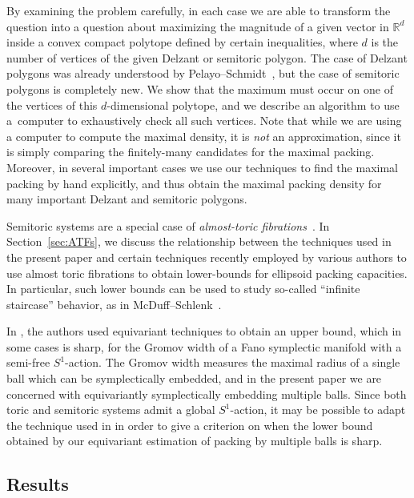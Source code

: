\documentclass[10pt,a4paper]{amsart}
\numberwithin{equation}{section}
\theoremstyle{definition}
\theoremstyle{plain}
\theoremstyle{plain}
\begin{document}
By examining the problem carefully, in each case we are able to transform the question into a question about maximizing the magnitude of a given vector in $\mathbb{R}^d$ inside a convex compact polytope defined by certain inequalities, where $d$ is the number of vertices of the given Delzant or semitoric polygon.
The case of Delzant polygons was already understood by Pelayo--Schmidt~\cite{PeSc2008}, but the case of semitoric polygons is completely new.
We show that the maximum must occur on one of the vertices of this $d$-dimensional polytope, and we describe an algorithm to use a~computer to exhaustively check all such vertices.
Note that while we are using a computer to compute the maximal density, it is \emph{not} an approximation, since it is simply comparing the finitely-many candidates for the maximal packing.
Moreover, in several important cases we use our techniques to find the maximal packing by hand explicitly, and thus obtain the
maximal packing density for many important Delzant and semitoric polygons.

\begin{Remark}\label{rmk:ATF}
Semitoric systems are a special case of \emph{almost-toric fibrations}~\cite{Sy2003}.
In Section~\ref{sec:ATFs}, we discuss the relationship between the techniques used in the present paper and certain techniques recently employed by various authors to use almost toric fibrations to obtain lower-bounds for ellipsoid packing capacities. In particular, such lower bounds can be used to study so-called ``infinite staircase'' behavior, as in McDuff--Schlenk~\cite{MS12}.
\end{Remark}

\begin{Remark}\label{rmk:S1-actions-sharp}
In \cite{HS17}, the authors used equivariant techniques to obtain an upper bound, which in some cases is sharp, for the Gromov width of a Fano symplectic manifold with a semi-free $S^1$-action.
The Gromov width measures the maximal radius of a single ball which can be symplectically embedded, and in the present paper we are concerned with equivariantly symplectically embedding multiple balls.
Since both toric and semitoric systems admit a global $S^1$-action, it may be possible to adapt the technique used in \cite{HS17} in order to give a criterion on when the lower bound obtained by our equivariant estimation of packing by multiple balls is sharp.
\end{Remark}

\subsection{Results}
\end{document}
